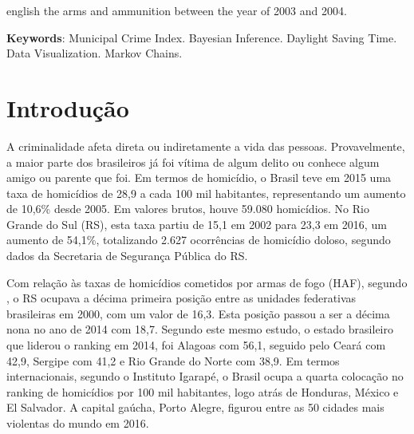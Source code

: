 \documentclass[12pt,openright,oneside,a4paper,english,french,spanish]{abntex2}
\numberwithin{table}{section} %
\numberwithin{figure}{section} %
\newcommand{\co}{\citeonline}
\begin{document}
\begin{resumo}[Abstract]
\begin{otherlanguage*}{english}
the arms and ammunition between the year of 2003 and 2004.



 \vspace{\onelineskip}

 \noindent 
 \textbf{Keywords}: Municipal Crime Index. Bayesian Inference. Daylight Saving Time. Data Visualization. Markov Chains.
 \end{otherlanguage*}
\end{resumo}

\setlength{\cftfigurenumwidth}{15mm} %
\listoffigures*
\cleardoublepage

\setlength{\cfttablenumwidth}{15mm} %
\listoftables*
\cleardoublepage

\tableofcontents*
\cleardoublepage



\textual






\chapter{Introdução\label{chap:Introducao}}

A criminalidade afeta direta ou indiretamente a vida das pessoas. Provavelmente, a maior parte dos brasileiros já foi vítima de algum delito ou conhece algum amigo ou parente que foi. Em termos de homicídio, o Brasil teve em 2015 uma taxa de homicídios de 28,9 a cada 100 mil habitantes, representando um aumento de 10,6\% desde 2005. Em valores brutos, houve 59.080 homicídios. No Rio Grande do Sul (RS), esta taxa partiu de 15,1 em 2002 para 23,3 em 2016, um aumento de 54,1\%,  totalizando 2.627 ocorrências de homicídio doloso, segundo dados da Secretaria de Segurança Pública do RS.

Com relação às taxas de homicídios cometidos por armas de fogo (HAF), segundo \co{waiselfisz2016mapa}, o RS ocupava a décima primeira posição entre as unidades federativas brasileiras em 2000, com um valor de 16,3. Esta posição passou a ser a décima nona no ano de 2014 com 18,7. Segundo este mesmo estudo, o estado brasileiro que liderou o ranking em 2014, foi Alagoas com 56,1, seguido pelo Ceará com 42,9, Sergipe com 41,2 e Rio Grande do Norte com 38,9. Em termos internacionais, segundo o Instituto Igarapé, o Brasil ocupa a quarta colocação no ranking de homicídios por 100 mil habitantes, logo atrás de Honduras, México e El Salvador. A capital gaúcha, Porto Alegre, figurou entre as 50 cidades mais violentas do mundo em 2016.
\end{document}
